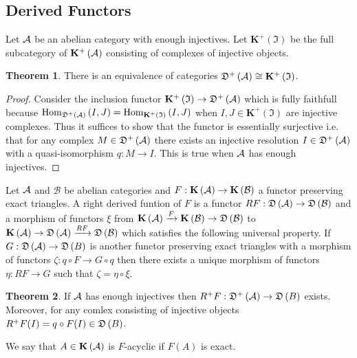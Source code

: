 \documentclass[12pt]{extarticle}
\theoremstyle{definition}
\newtheorem{theorem}{Theorem}[section]
\newenvironment{definition}[1][Definition:]{\begin{trivlist}
\item[\hskip \labelsep {\bfseries #1}]}{\end{trivlist}}
\begin{document}
\subsection{Derived Functors}

\newcommand{\Kplus}[1]{\mathbf{K}^+\left( #1 \right)}
\newcommand{\Dplus}[1]{\mathfrak{D}^+\left( #1 \right)}
\newcommand{\I}{\mathfrak{I}}
\newcommand{\B}{\mathcal{B}}

Let $\mathcal{A}$ be an abelian category with enough injectives. Let $\Kplus{\I}$ be the full subcategory of $\Kplus{\A}$ consisting of complexes of injective objects.

\begin{theorem}
There is an equivalence of categories $\Dplus{\A} \cong \Kplus{\I}$. 
\end{theorem}

\begin{proof}
Consider the inclusion functor $\Kplus{\I} \to \Dplus{\A}$ which is fully faithfull because $\Homover{\Dplus{\A}}{I}{J} = \Homover{\Kplus{\I}}{I}{J}$ when $I,J \in \Kplus{\I}$ are injective complexes. Thus it suffices to show that the functor is essentially surjective i.e. that for any complex $M \in \Dplus{\A}$ there exists an injective resolution $I \in \Dplus{\A}$ with a quasi-isomorphism $q : M \to I$. This is true when $\mathcal{A}$ has enough injectives.
\end{proof}

\begin{definition}
Let $\mathcal{A}$ and $\B$ be abelian categories and $F : \Khom{\A} \to \Khom{\B}$ a functor preserving exact triangles. A right derived funtion of $F$ is a functor $RF : \D{\A} \to \D{\B}$ and a morphism of functors $\xi$ from $\Khom{\A} \xrightarrow{F} \Khom{\B} \to \D{\B}$ to $\Khom{\A} \to \D{\A} \xrightarrow{RF} \D{\B}$ which satisfies the following universal property. If $G : \mathfrak{D}\left( \mathcal{A} \right) \to \mathfrak{D}\left( B \right)$ is another functor preserving exact triangles with a morphism of functors $\zeta : q \circ F \to G \circ q$ then there exists a unique morphism of functors $\eta : RF \to G$ such that $\zeta = \eta \circ \xi$. 
\end{definition}

\begin{theorem}
If $\mathcal{A}$ has enough injectives then $R^+ F : \Dplus{\A} \to \D{B}$ exists. Moreover, for any comlex consisting of injective objects $R^+ F(I) = q \circ F(I) \in \mathfrak{D}\left( B \right)$. 
\end{theorem}

\begin{definition}
We say that $A \in \mathbf{K}\left( \mathcal{A} \right)$ is $F$-acyclic if $F(A)$ is exact. 
\end{definition}
\end{document}
